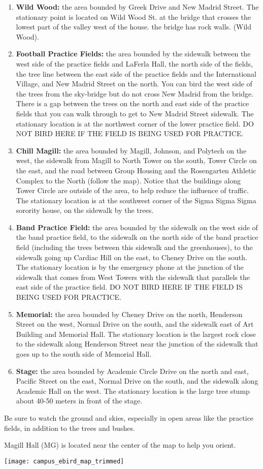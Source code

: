\documentclass[12pt]{article}
\begin{document}
\begin{enumerate}
\item \textbf{Wild Wood:} the area bounded by Greek Drive and New Madrid Street. The stationary point is located on Wild Wood St. at the bridge that crosses the lowest part of the valley west of the house. the bridge has rock walls. (Wild Wood).

\item \textbf{Football Practice Fields:} the area bounded by the sidewalk between the west side of the practice fields and LaFerla Hall, the north side of the fields, the tree line between the east side of the practice fields and the International Village, and New Madrid Street on the north. You can bird the west side of the trees from the sky-bridge but do not cross New Madrid from the bridge. There is a gap between the trees on the north and east side of the practice fields that you can walk through to get to New Madrid Street sidewalk. The stationary location is at the northwest corner of the lower practice field. DO NOT BIRD HERE IF THE FIELD IS BEING USED FOR PRACTICE.

\item \textbf{Chill Magill:} the area bounded by Magill, Johnson, and Polytech on the west, the sidewalk from Magill to North Tower on the south, Tower Circle on the east, and the road between Group Housing and the Rosengarten Athletic Complex to the North (follow the map). Notice that the buildings along Tower Circle are outside of the area, to help reduce the influence of traffic. The stationary location is at the southwest corner of the Sigma Sigma Sigma sorority house, on the sidewalk by the trees.

\item \textbf{Band Practice Field:} the area bounded by the sidewalk on the west side of the band practice field, to the sidewalk on the north side of the band practice field (including the trees between this sidewalk and the greenhouses), to the sidewalk going up Cardiac Hill on the east, to Cheney Drive on the south. The stationary location is by the emergency phone at the junction of the sidewalk that comes from West Towers with the sidewalk that parallels the east side of the practice field.  DO NOT BIRD HERE IF THE FIELD IS BEING USED FOR PRACTICE.

\item \textbf{Memorial:} the area bounded by Cheney Drive on the north, Henderson Street on the west, Normal Drive on the south, and the sidewalk east of Art Building and Memorial Hall. The stationary location is the largest rock close to the sidewalk along Henderson Street near the junction of the sidewalk that goes up to the south side of Memorial Hall.

\item \textbf{Stage:} the area bounded by Academic Circle Drive on the north and east, Pacific Street on the east, Normal Drive on the south, and the sidewalk along Academic Hall on the west. The stationary location is the large tree stump about 40-50 meters in front of the stage.
\end{enumerate}

Be sure to watch the ground and skies, especially in open areas like the practice fields, in addition to the trees and bushes.


\newpage

Magill Hall (MG) is located near the center of the map to help you orient.

\texttt{[image: campus\_ebird\_map\_trimmed]}
\end{document}
